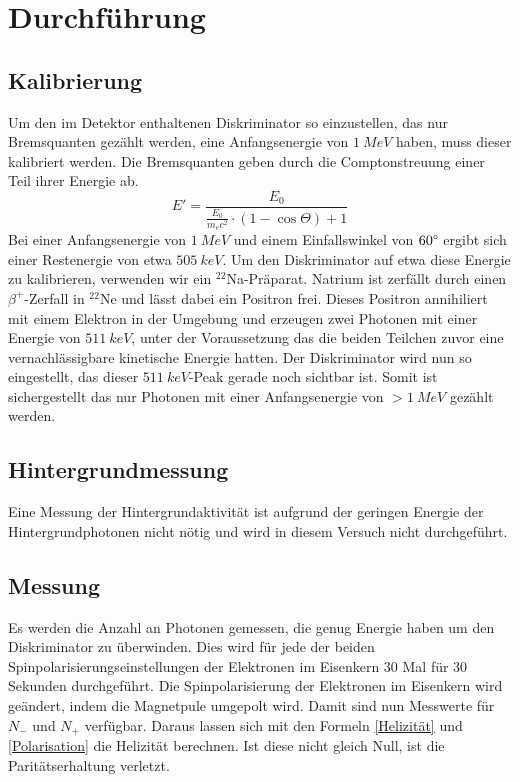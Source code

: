 \section{Durchführung}
\subsection{Kalibrierung}
Um den im Detektor enthaltenen Diskriminator so einzustellen, das nur Bremsquanten gezählt werden, eine Anfangsenergie von $\SI{1}{MeV}$ haben, muss dieser kalibriert werden. Die Bremsquanten geben durch die Comptonstreuung einer Teil ihrer Energie ab. 
$$E' = \frac{E_0}{\frac{E_0}{m_ec^2}\cdot(1-\cos{\Theta})+1}$$
Bei einer Anfangsenergie von $\SI{1}{MeV}$ und einem Einfallswinkel von $60\degree$ ergibt sich einer Restenergie von etwa $\SI{505}{keV}$. Um den Diskriminator auf etwa diese Energie zu kalibrieren, verwenden wir ein $^{22}$Na-Präparat. Natrium ist zerfällt durch einen $\beta^+$-Zerfall in $^{22}$Ne und lässt dabei ein Positron frei. Dieses Positron annihiliert mit einem Elektron in der Umgebung und erzeugen zwei Photonen mit einer Energie von $\SI{511}{keV}$, unter der Voraussetzung das die beiden Teilchen zuvor eine vernachlässigbare kinetische Energie hatten. Der Diskriminator wird nun so eingestellt, das dieser $\SI{511}{keV}$-Peak gerade noch sichtbar ist. Somit ist sichergestellt das nur Photonen mit einer Anfangsenergie von $>\SI{1}{MeV}$ gezählt werden.
\subsection{Hintergrundmessung}
Eine Messung der Hintergrundaktivität ist aufgrund der geringen Energie der Hintergrundphotonen nicht nötig und wird in diesem Versuch nicht durchgeführt.
\subsection{Messung}
Es werden die Anzahl an Photonen gemessen, die genug Energie haben um den Diskriminator zu überwinden. Dies wird für jede der beiden Spinpolarisierungseinstellungen der Elektronen im Eisenkern 30 Mal für 30 Sekunden durchgeführt. Die Spinpolarisierung der Elektronen im Eisenkern wird geändert, indem die Magnetpule umgepolt wird. Damit sind nun Messwerte für $N_-$ und $N_+$ verfügbar. Daraus lassen sich mit den Formeln \ref{Helizität} und \ref{Polarisation} die Helizität berechnen. Ist diese nicht gleich Null, ist die Paritätserhaltung verletzt. 